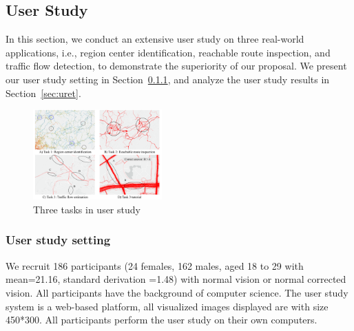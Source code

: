 \subsection{User Study}\label{sec:user}
In this section, we conduct an extensive user study on three real-world applications, i.e., region center identification, reachable route inspection, and traffic flow detection, to demonstrate the superiority of our proposal.
We present our user study setting in Section~\ref{sec:uset}, and analyze the user study results in Section~\ref{sec:uret}.



\begin{figure}[t]
	\centering
	\includegraphics[width=0.44\textwidth]{pictures/user_study/interface.pdf}
	\vspace{-3mm}
	\caption{Three tasks in user study}
	\label{fig:apps}
	\vspace{-6mm}
\end{figure}

\subsubsection{User study setting}\label{sec:uset}

We recruit 186 participants (24 females, 162 males, aged 18 to 29 with mean=21.16, standard derivation =1.48) with normal vision or normal corrected vision.
All participants have the background of computer science.
The user study system is a web-based platform, all visualized images displayed are with size 450*300.
All participants perform the user study on their own computers.


